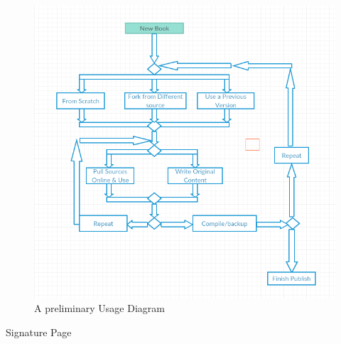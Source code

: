\documentclass[letterpaper, 10pt, draftclsnofoot, onecolumn]{IEEEtran}
\begin{document}
{{{\begin{figure}[ht!]
\centering
\includegraphics[width=150mm]{usage_diagram.png}
\caption{A preliminary Usage Diagram}
\end{figure}

\bigskip

\newpage
\centerline{\sc \large Signature Page}
\vspace{5pc}


\centering

}}}
\end{document}

